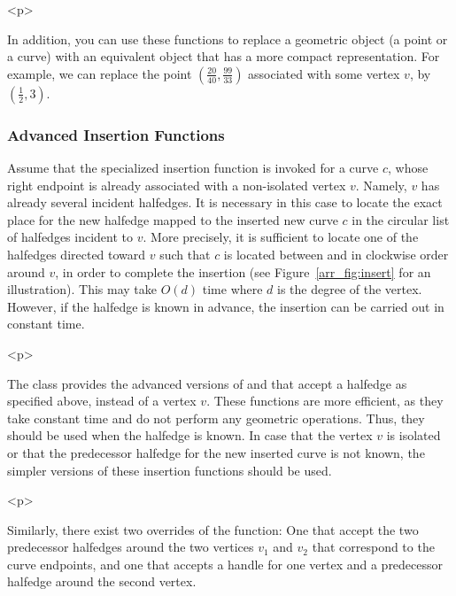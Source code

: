 \begin{ccHtmlOnly}<p>\end{ccHtmlOnly}
In addition, you can use these functions to replace a geometric
object (a point or a curve) with an equivalent object that has a
more compact representation. For example, we can replace the point
$(\frac{20}{40}, \frac{99}{33})$ associated with some vertex $v$,
by $(\frac{1}{2}, 3)$.

\begin{ccAdvanced}
\subsubsection{Advanced Insertion Functions}
\label{arr_sssec:adv_insert}
%
Assume that the specialized insertion function
 is invoked for a curve $c$,
whose right endpoint is already associated with a non-isolated
vertex $v$.  Namely, $v$ has already several incident halfedges. It
is necessary in this case to locate the exact place for the
new halfedge mapped to the inserted new curve $c$ in the circular
list of halfedges incident to $v$. More precisely, it is sufficient
to locate one of the halfedges  directed toward $v$ such
that $c$ is located between  and  in
clockwise order around $v$, in order to complete the insertion
(see Figure~\ref{arr_fig:insert} for an illustration). This may
take $O(d)$ time where $d$ is the degree of the vertex. However,
if the halfedge  is known in advance, the insertion can
be carried out in constant time.

\begin{ccHtmlOnly}<p>\end{ccHtmlOnly}
The  class provides the advanced versions of
 and
 that accept a halfedge 
as specified above, instead of a vertex $v$. These functions are
more efficient, as they take constant time and do not perform any
geometric operations. Thus, they should be used when the halfedge
 is known. In case that the vertex $v$ is isolated or
that the predecessor halfedge for the new inserted curve is not
known, the simpler versions of these insertion functions should be
used.

\begin{ccHtmlOnly}<p>\end{ccHtmlOnly}
Similarly, there exist two overrides of the
 function: One that accept the two
predecessor halfedges around the two vertices $v_1$ and $v_2$ that
correspond to the curve endpoints, and one that accepts a handle
for one vertex and a predecessor halfedge around the second
vertex.


\end{ccAdvanced}
